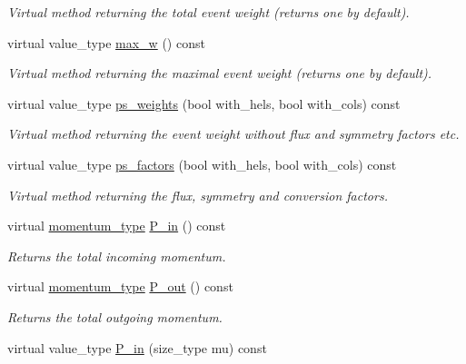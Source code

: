 \begin{DoxyCompactItemize}
\begin{DoxyCompactList}\small\item\em Virtual method returning the total event weight (returns one by default). \end{DoxyCompactList}\item 
\hypertarget{a00442_ac50bcb2c604b7cd12da4f27ef3fb4414}{virtual value\-\_\-type \hyperlink{a00442_ac50bcb2c604b7cd12da4f27ef3fb4414}{max\-\_\-w} () const }\label{a00442_ac50bcb2c604b7cd12da4f27ef3fb4414}

\begin{DoxyCompactList}\small\item\em Virtual method returning the maximal event weight (returns one by default). \end{DoxyCompactList}\item 
virtual value\-\_\-type \hyperlink{a00442_a258fb687d61e5a0d9d12d5e1d45db8aa}{ps\-\_\-weights} (bool with\-\_\-hels, bool with\-\_\-cols) const 
\begin{DoxyCompactList}\small\item\em Virtual method returning the event weight without flux and symmetry factors etc. \end{DoxyCompactList}\item 
virtual value\-\_\-type \hyperlink{a00442_aea34ea1dada7a4cece83b42c7d50db55}{ps\-\_\-factors} (bool with\-\_\-hels, bool with\-\_\-cols) const 
\begin{DoxyCompactList}\small\item\em Virtual method returning the flux, symmetry and conversion factors. \end{DoxyCompactList}\item 
\hypertarget{a00442_a4cc227a869306f34f6d34efa01dbd357}{virtual \hyperlink{a00559}{momentum\-\_\-type} \hyperlink{a00442_a4cc227a869306f34f6d34efa01dbd357}{P\-\_\-in} () const }\label{a00442_a4cc227a869306f34f6d34efa01dbd357}

\begin{DoxyCompactList}\small\item\em Returns the total incoming momentum. \end{DoxyCompactList}\item 
\hypertarget{a00442_adbe567091708239995eba7c5897625c0}{virtual \hyperlink{a00559}{momentum\-\_\-type} \hyperlink{a00442_adbe567091708239995eba7c5897625c0}{P\-\_\-out} () const }\label{a00442_adbe567091708239995eba7c5897625c0}

\begin{DoxyCompactList}\small\item\em Returns the total outgoing momentum. \end{DoxyCompactList}\item 
\hypertarget{a00442_a7be32a29baf508f1957bd6f22bd6ae0c}{virtual value\-\_\-type \hyperlink{a00442_a7be32a29baf508f1957bd6f22bd6ae0c}{P\-\_\-in} (size\-\_\-type mu) const }\label{a00442_a7be32a29baf508f1957bd6f22bd6ae0c}


\end{DoxyCompactItemize}
